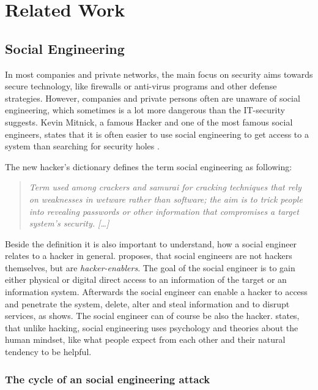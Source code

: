 \chapter{Related Work}
\label{chapter:relatedwork}

\section{Social Engineering}

In most companies and private networks, the main focus on security aims towards
secure technology, like firewalls or anti-virus programs and other defense
strategies. However, companies and private persons often are unaware of social
engineering, which sometimes is a lot more dangerous than the IT-security
suggests. Kevin Mitnick, a famous Hacker and one of the most famous social
engineers, states that it is often easier to use social engineering to get
access to a system than searching for security holes \cite{mitnick2003}.

The new hacker's dictionary \cite{raymond1996} defines the term social engineering as
following:
\begin{quote}
\textit{Term used among crackers and samurai for cracking techniques that rely on
weaknesses in wetware rather than software; the aim is to trick people into
revealing passwords or other information that compromises a target system's
security. [\dots]}
\end{quote}

Beside the definition it is also important to understand, how a social engineer
relates to a hacker in general. \cite{thornburgh2004} proposes, that social
engineers are not hackers themselves, but are \textit{hacker-enablers}.  The
goal of the social engineer is to gain either physical or digital direct access
to an information of the target or an information system.  Afterwards the
social engineer can enable a hacker to access and penetrate the system, delete,
alter and steal information and to disrupt services, as \cite{thornburgh2004}
shows. The social engineer can of course be also the hacker. \cite{jones2004}
states, that unlike hacking, social engineering uses psychology and theories
about the human mindset, like what people expect from each other and their
natural tendency to be helpful.

\subsection{The cycle of an social engineering attack}

